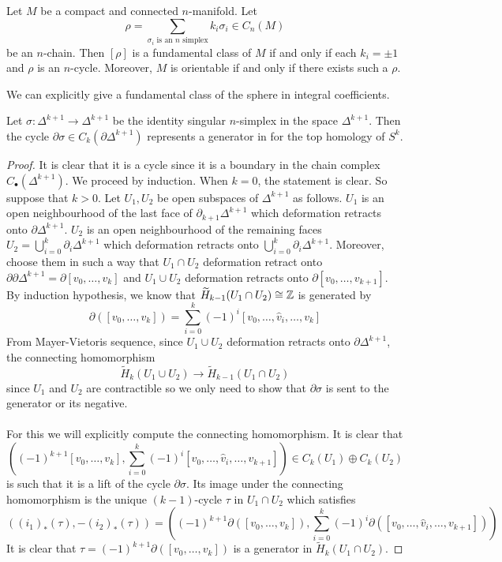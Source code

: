 \documentclass[a4paper]{article}
\begin{document}
\begin{prp}{}{} Let $M$ be a compact and connected $n$-manifold. Let $$\rho=\sum_{\sigma_i\text{ is an }n\text{ simplex}}k_i\sigma_i\in C_n(M)$$ be an $n$-chain. Then $[\rho]$ is a fundamental class of $M$ if and only if each $k_i=\pm 1$ and $\rho$ is an $n$-cycle. Moreover, $M$ is orientable if and only if there exists such a $\rho$. 
\end{prp}

We can explicitly give a fundamental class of the sphere in integral coefficients. 

\begin{prp}{}{} Let $\sigma:\Delta^{k+1}\to\Delta^{k+1}$ be the identity singular $n$-simplex in the space $\Delta^{k+1}$. Then the cycle $\partial\sigma\in C_k(\partial\Delta^{k+1})$ represents a generator in for the top homology of $S^k$. \tcbline
\begin{proof}
It is clear that it is a cycle since it is a boundary in the chain complex $C_\bullet(\Delta^{k+1})$. We proceed by induction. When $k=0$, the statement is clear. So suppose that $k>0$. Let $U_1,U_2$ be open subspaces of $\Delta^{k+1}$ as follows. $U_1$ is an open neighbourhood of the last face of $\partial_{k+1}\Delta^{k+1}$ which deformation retracts onto $\partial\Delta^{k+1}$. $U_2$ is an open neighbourhood of the remaining faces $U_2=\bigcup_{i=0}^k\partial_i\Delta^{k+1}$ which deformation retracts onto $\bigcup_{i=0}^k\partial_i\Delta^{k+1}$. Moreover, choose them in such a way that $U_1\cap U_2$ deformation retract onto $\partial\partial\Delta^{k+1}=\partial[v_0,\dots,v_k]$ and $U_1\cup U_2$ deformation retracts onto $\partial[v_0,\dots,v_{k+1}]$. By induction hypothesis, we know that $\widetilde{H}_{k-1}(U_1\cap U_2)\cong\mathbb{Z}$ is generated by $$\partial([v_0,\dots,v_k])=\sum_{i=0}^k(-1)^i[v_0,\dots,\hat{v}_i,\dots,v_k]$$ From Mayer-Vietoris sequence, since $U_1\cup U_2$ deformation retracts onto $\partial\Delta^{k+1}$, the connecting homomorphism $$\widetilde{H}_k(U_1\cup U_2)\to\widetilde{H}_{k-1}(U_1\cap U_2)$$ since $U_1$ and $U_2$ are contractible so we only need to show that $\partial\sigma$ is sent to the generator or its negative. \\~\\

For this we will explicitly compute the connecting homomorphism. It is clear that $$\left((-1)^{k+1}[v_0,\dots,v_k],\sum_{i=0}^k(-1)^i[v_0,\dots,\hat{v}_i,\dots,v_{k+1}]\right)\in C_k(U_1)\oplus C_k(U_2)$$ is such that it is a lift of the cycle $\partial\sigma$. Its image under the connecting homomorphism is the unique $(k-1)$-cycle $\tau$ in $U_1\cap U_2$ which satisfies $$\left((i_1)_\ast(\tau),-(i_2)_\ast(\tau)\right)=\left((-1)^{k+1}\partial([v_0,\dots,v_k]),\sum_{i=0}^k(-1)^i\partial([v_0,\dots,\hat{v}_i,\dots,v_{k+1}])\right)$$ It is clear that $\tau=(-1)^{k+1}\partial([v_0,\dots,v_k])$ is a generator in $\widetilde{H}_k(U_1\cap U_2)$. 
\end{proof}
\end{prp}
\end{document}
